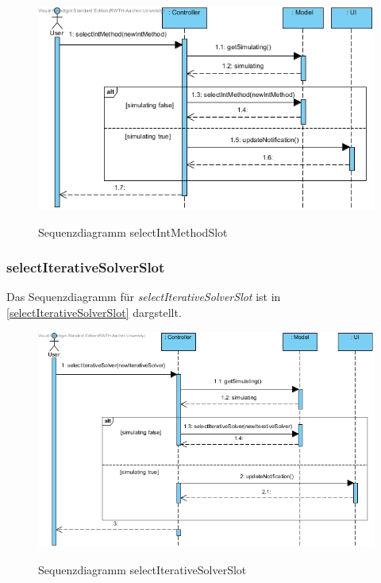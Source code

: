 \begin{figure}[H]
	\centering
	\includegraphics[scale=.6]{Bilder/Controller__selectIntMethodSlot().jpg}\\
	\caption{Sequenzdiagramm selectIntMethodSlot}
	\label{Sequenzdiagramm selectIntMethodSlot}
\end{figure}

\subsubsection*{selectIterativeSolverSlot}

Das Sequenzdiagramm für \emph{selectIterativeSolverSlot} ist in \ref{selectIterativeSolverSlot} dargstellt.

\begin{figure}[H]
	\centering
	\includegraphics[scale=.6]{Bilder/Controller__selectIterativeSolverSlot().jpg}\\
	\caption{Sequenzdiagramm selectIterativeSolverSlot}
	\label{Sequenzdiagramm selectIterativeSolverSlot}
\end{figure}

